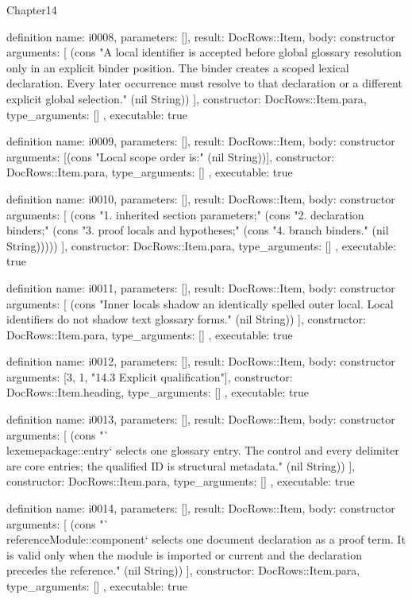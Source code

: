 \begin{lexlean}{Chapter14}
\begin{semanticmodule}
definition{
  name: i0008,
  parameters: [],
  result: DocRows::Item,
  body: constructor{
    arguments: [
      (cons "A local identifier is accepted before global glossary resolution only in an explicit binder position. The binder creates a scoped lexical declaration. Every later occurrence must resolve to that declaration or a different explicit global selection." (nil String))
    ],
    constructor: DocRows::Item.para,
    type_arguments: []
  },
  executable: true
}

definition{
  name: i0009,
  parameters: [],
  result: DocRows::Item,
  body: constructor{
    arguments: [(cons "Local scope order is:" (nil String))],
    constructor: DocRows::Item.para,
    type_arguments: []
  },
  executable: true
}

definition{
  name: i0010,
  parameters: [],
  result: DocRows::Item,
  body: constructor{
    arguments: [
      (cons "1. inherited section parameters;" (cons "2. declaration binders;" (cons "3. proof locals and hypotheses;" (cons "4. branch binders." (nil String)))))
    ],
    constructor: DocRows::Item.para,
    type_arguments: []
  },
  executable: true
}

definition{
  name: i0011,
  parameters: [],
  result: DocRows::Item,
  body: constructor{
    arguments: [
      (cons "Inner locals shadow an identically spelled outer local. Local identifiers do not shadow text glossary forms." (nil String))
    ],
    constructor: DocRows::Item.para,
    type_arguments: []
  },
  executable: true
}

definition{
  name: i0012,
  parameters: [],
  result: DocRows::Item,
  body: constructor{
    arguments: [3, 1, "14.3 Explicit qualification"],
    constructor: DocRows::Item.heading,
    type_arguments: []
  },
  executable: true
}

definition{
  name: i0013,
  parameters: [],
  result: DocRows::Item,
  body: constructor{
    arguments: [
      (cons "`\\lexeme{package::entry}` selects one glossary entry. The control and every delimiter are core entries; the qualified ID is structural metadata." (nil String))
    ],
    constructor: DocRows::Item.para,
    type_arguments: []
  },
  executable: true
}

definition{
  name: i0014,
  parameters: [],
  result: DocRows::Item,
  body: constructor{
    arguments: [
      (cons "`\\reference{Module::component}` selects one document declaration as a proof term. It is valid only when the module is imported or current and the declaration precedes the reference." (nil String))
    ],
    constructor: DocRows::Item.para,
    type_arguments: []
  },
  executable: true
}


\end{semanticmodule}
\end{lexlean}
